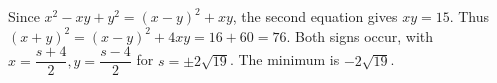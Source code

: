 Since $x^2-xy+y^2=(x-y)^2+xy$, the second equation gives $xy=15$. Thus $(x+y)^2=(x-y)^2+4xy=16+60=76$. Both signs occur, with $x=\dfrac{s+4}{2},y=\dfrac{s-4}{2}$ for $s=\pm2\sqrt{19}$. The minimum is $\boxed{-2\sqrt{19}}$.
